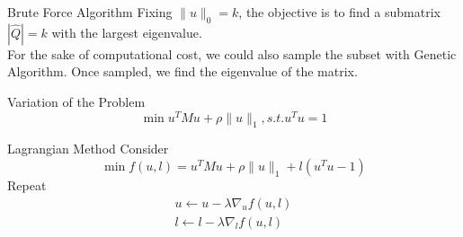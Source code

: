 \documentclass[xcolor=dvipsnames]{beamer}
\begin{document}
\begin{frame}{Brute Force Algorithm}
Fixing $\|u\|_0=k$, the objective is to find a submatrix $|\hat{Q}|=k$ with the largest eigenvalue.\\
For the sake of computational cost, we could also sample the subset with Genetic Algorithm. Once sampled, we find the eigenvalue of the matrix.\\
\end{frame}
\begin{frame}{Variation of the Problem}
\[
\min u^TMu+\rho\|u\|_1, s.t. u^Tu=1
\]
\end{frame}
\begin{frame}{Lagrangian Method}
Consider
\[
\min f(u,l)=u^TMu+\rho\|u\|_1+l(u^Tu-1)
\]
Repeat
\begin{eqnarray}
u\leftarrow u-\lambda\nabla_uf(u,l)\nonumber\\
l\leftarrow l-\lambda\nabla_lf(u,l)\nonumber
\end{eqnarray}
\end{frame}
\end{document}
